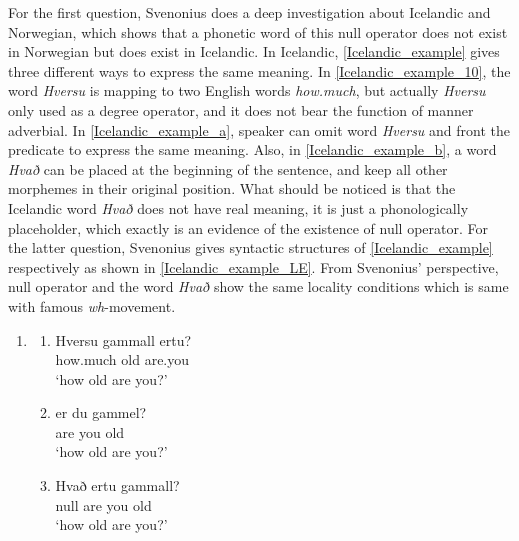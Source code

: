 \documentclass{ctexart}
\begin{document}
For the first question, Svenonius does a deep investigation about Icelandic and Norwegian, which shows that a phonetic word of this null operator does not exist in Norwegian but does exist in Icelandic. In Icelandic, \ref{Icelandic_example} gives three different ways to express the same meaning. In \ref{Icelandic_example_10}, the word \textit{Hversu} is mapping to two English words \textit{how.much}, but actually \textit{Hversu} only used as a degree operator, and it does not bear the function of manner adverbial. In \ref{Icelandic_example_a}, speaker can omit word \textit{Hversu} and front the predicate to express the same meaning. Also, in \ref{Icelandic_example_b}, a word \textit{Hvað} can be placed at the beginning of the sentence, and keep all other morphemes in their original position. What should be noticed is that the Icelandic word \textit{Hvað} does not have real meaning, it is just a phonologically placeholder, which exactly is an evidence of the existence of null operator. For the latter question, Svenonius gives syntactic structures of \ref{Icelandic_example} respectively as shown in \ref{Icelandic_example_LE}. From Svenonius' perspective, null operator and the word \textit{Hvað} show the same locality conditions which is same with famous \textit{wh}-movement. 

\begin{enumerate}
    \item \label{Icelandic_example}
    
    \begin{enumerate}
        \item \label{Icelandic_example_10}
        Hversu \enspace \enspace gammall \enspace ertu? \\
        how.much \enspace old \enspace \enspace \enspace are.you \\
        `how old are you?'

        \item \label{Icelandic_example_a}
        er \enspace du gammel? \\
        are you \enspace old \\
        `how old are you?'

        \item \label{Icelandic_example_b}
        Hvað ertu \enspace \enspace gammall? \\
        null \enspace are you \enspace old \\
        `how old are you?'

    \end{enumerate}   
    
\end{enumerate}
\end{document}
